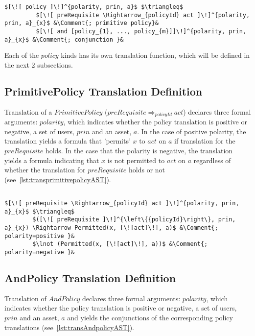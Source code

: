 \lstset{mathescape, language=AST}  
\begin{lstlisting}[frame=single, caption={Policy Translation Definition},label={lst:transpolicydefinitionAST}]
$[\![ policy ]\!]^{polarity, prin, a}$ $\triangleq$ 
         $[\![ preRequisite \Rightarrow_{policyId} act ]\!]^{polarity, prin, a}_{x}$ &\Comment{; primitive policy}&
         $[\![ and [policy_{1}, ..., policy_{m}]]\!]^{polarity, prin, a}_{x}$ &\Comment{; conjunction }&

\end{lstlisting}

Each of the $policy$ kinds has its own translation function, which will be defined in the next 2 subsections. 

\subsection{PrimitivePolicy Translation Definition}
Translation of a $PrimitivePolicy$ ($preRequisite \Rightarrow_{policyId} act$) declares three formal arguments: $polarity$, which indicates whether the policy translation is positive or negative, a set of users, $prin$ and an asset, $a$. In the case of positive polarity, the translation yields a formula that 'permits' $x$ to $act$ on $a$ if translation for the $preRequisite$ holds. In the case that the polarity is negative, the translation yields a formula indicating that $x$ is not permitted to $act$ on $a$ regardless of whether the translation for $preRequisite$ holds or not (see~\ref{lst:transprimitivepolicyAST}).

\lstset{mathescape, language=AST} 
\begin{lstlisting}[frame=single, caption={PrimitivePolicy Translation Definition},label={lst:transprimitivepolicyAST}]

$[\![ preRequisite \Rightarrow_{policyId} act ]\!]^{polarity, prin, a}_{x}$ $\triangleq$ 
        $([\![ preRequisite ]\!]^{\left\{{policyId}\right\}, prin, a}_{x}) \Rightarrow Permitted(x, [\![act]\!], a)$ &\Comment{; polarity=positive }&
        $\lnot (Permitted(x, [\![act]\!], a))$ &\Comment{; polarity=negative }&

\end{lstlisting}


\subsection{AndPolicy Translation Definition}
Translation of $AndPolicy$ declares three formal arguments: $polarity$, which indicates whether the policy translation is positive or negative, a set of users, $prin$ and an asset, $a$ and yields the conjunctions of the corresponding policy translations (see~\ref{lst:transAndpolicyAST}). 

